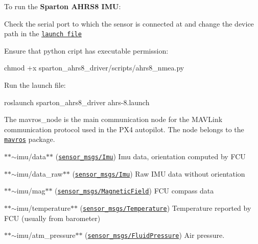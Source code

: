 To run the {\bfseries Sparton A\+H\+R\+S8 I\+MU}\+:


\begin{DoxyEnumerate}
\item Check the serial port to which the sensor is connected at and change the device path in the \href{launch/ahrs-8.launch}{\tt launch file} 

\item Ensure that python cript has executable permission\+: 
\begin{DoxyCode}
chmod +x sparton\_ahrs8\_driver/scripts/ahrs8\_nmea.py
\end{DoxyCode}

\item Run the launch file\+: 
\begin{DoxyCode}
roslaunch sparton\_ahrs8\_driver ahrs-8.launch
\end{DoxyCode}

\end{DoxyEnumerate}

The {\ttfamily mavros\+\_\+node} is the main communication node for the M\+A\+V\+Link communication protocol used in the P\+X4 autopilot. The node belongs to the \href{http://wiki.ros.org/mavros}{\tt mavros} package.


\begin{DoxyItemize}
\item $\ast$$\ast${\ttfamily $\sim$imu/data}$\ast$$\ast$ (\href{http://docs.ros.org/api/sensor_msgs/html/msg/Imu.html}{\tt sensor\+\_\+msgs/\+Imu}) Imu data, orientation computed by F\+CU
\item $\ast$$\ast${\ttfamily $\sim$imu/data\+\_\+raw}$\ast$$\ast$ (\href{http://docs.ros.org/api/sensor_msgs/html/msg/Imu.html}{\tt sensor\+\_\+msgs/\+Imu}) Raw I\+MU data without orientation
\item $\ast$$\ast${\ttfamily $\sim$imu/mag}$\ast$$\ast$ (\href{http://docs.ros.org/api/sensor_msgs/html/msg/MagneticField.html}{\tt sensor\+\_\+msgs/\+Magnetic\+Field}) F\+CU compass data
\item $\ast$$\ast${\ttfamily $\sim$imu/temperature}$\ast$$\ast$ (\href{http://docs.ros.org/api/sensor_msgs/html/msg/Temperature.html}{\tt sensor\+\_\+msgs/\+Temperature}) Temperature reported by F\+CU (usually from barometer)
\item $\ast$$\ast${\ttfamily $\sim$imu/atm\+\_\+pressure}$\ast$$\ast$ (\href{http://docs.ros.org/api/sensor_msgs/html/msg/FluidPressure.html}{\tt sensor\+\_\+msgs/\+Fluid\+Pressure}) Air pressure.
\end{DoxyItemize}


